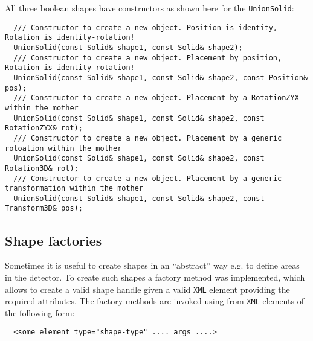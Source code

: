 All three boolean shapes have constructors as shown here for the \texttt{UnionSolid}:
\begin{verbatim}
  /// Constructor to create a new object. Position is identity, Rotation is identity-rotation!
  UnionSolid(const Solid& shape1, const Solid& shape2);
  /// Constructor to create a new object. Placement by position, Rotation is identity-rotation!
  UnionSolid(const Solid& shape1, const Solid& shape2, const Position& pos);
  /// Constructor to create a new object. Placement by a RotationZYX within the mother
  UnionSolid(const Solid& shape1, const Solid& shape2, const RotationZYX& rot);
  /// Constructor to create a new object. Placement by a generic rotoation within the mother
  UnionSolid(const Solid& shape1, const Solid& shape2, const Rotation3D& rot);
  /// Constructor to create a new object. Placement by a generic transformation within the mother
  UnionSolid(const Solid& shape1, const Solid& shape2, const Transform3D& pos);
\end{verbatim}
\newpage

\subsection{Shape factories} 
Sometimes it is useful to create shapes in an ``abstract'' way e.g. to define areas in the detector. To create such shapes a factory method was implemented, which allows to create a valid shape handle given a valid \texttt{XML} element providing the required attributes. The factory methods are invoked using from \texttt{XML} elements of the following form:
\begin{verbatim}
  <some_element type="shape-type" .... args ....>
\end{verbatim}

